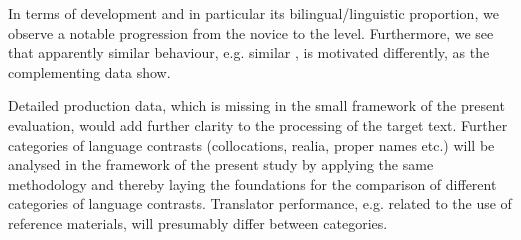 \documentclass[output=paper]{langsci/langscibook.cls}
\begin{document}
In terms of  development and in particular its bilingual/linguistic proportion, we observe a notable progression from the novice to the  level.  Furthermore, we see that apparently similar behaviour, e.g. similar , is motivated differently, as the complementing data show.  

Detailed production data, which is missing in the small framework of the present evaluation, would add further clarity to the processing of the target text.  Further categories of language contrasts (collocations, realia, proper names etc.) will be analysed in the framework of the present study by applying the same methodology and thereby laying the foundations for the comparison of different categories of language contrasts. Translator performance, e.g. related to the use of reference materials, will presumably differ between categories.

{\sloppy
\printbibliography[heading=subbibliography,notkeyword=this]
}
\end{document}
